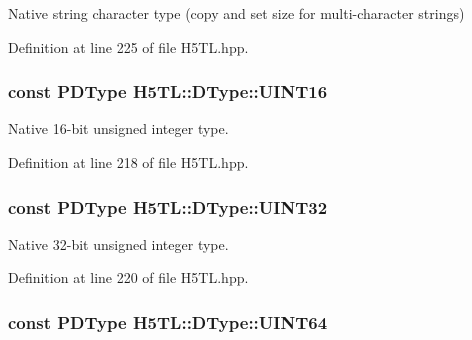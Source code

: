 Native string character type (copy and set size for multi-\/character strings) 



Definition at line 225 of file H5\-T\-L.\-hpp.

\hypertarget{class_h5_t_l_1_1_d_type_a95cecc3c8350b6088acbc497a89c3c10}{
\subsubsection[{U\-I\-N\-T16}]{\setlength{\rightskip}{0pt plus 5cm}const {\bf P\-D\-Type} H5\-T\-L\-::\-D\-Type\-::\-U\-I\-N\-T16\hspace{0.3cm}{\ttfamily [static]}}}\label{class_h5_t_l_1_1_d_type_a95cecc3c8350b6088acbc497a89c3c10}


Native 16-\/bit unsigned integer type. 



Definition at line 218 of file H5\-T\-L.\-hpp.

\hypertarget{class_h5_t_l_1_1_d_type_a29c3994fbc6782ddfb316178fa17864d}{
\subsubsection[{U\-I\-N\-T32}]{\setlength{\rightskip}{0pt plus 5cm}const {\bf P\-D\-Type} H5\-T\-L\-::\-D\-Type\-::\-U\-I\-N\-T32\hspace{0.3cm}{\ttfamily [static]}}}\label{class_h5_t_l_1_1_d_type_a29c3994fbc6782ddfb316178fa17864d}


Native 32-\/bit unsigned integer type. 



Definition at line 220 of file H5\-T\-L.\-hpp.

\hypertarget{class_h5_t_l_1_1_d_type_abc95d3cc92fc398366a0a52bd21ded7a}{
\subsubsection[{U\-I\-N\-T64}]{\setlength{\rightskip}{0pt plus 5cm}const {\bf P\-D\-Type} H5\-T\-L\-::\-D\-Type\-::\-U\-I\-N\-T64\hspace{0.3cm}{\ttfamily [static]}}}\label{class_h5_t_l_1_1_d_type_abc95d3cc92fc398366a0a52bd21ded7a}


